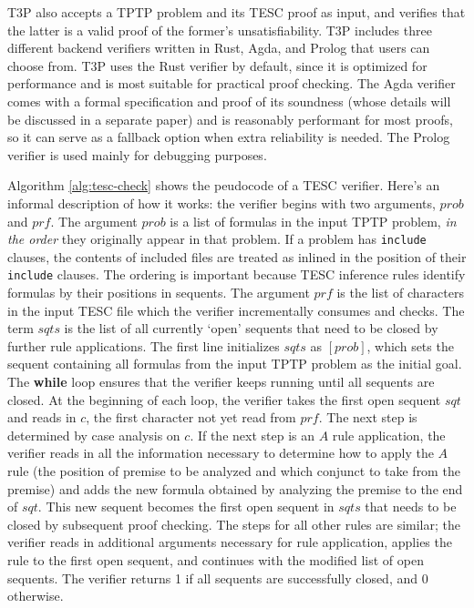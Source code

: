 \documentclass[12pt]{article}
\newcommand{\Prf}[0]{\mathit{prf}}
\newcommand{\Sqts}[0]{\mathit{sqts}}
\begin{document}
T3P also accepts a TPTP problem and its TESC proof as input, and verifies that the 
latter is a valid proof of the former's unsatisfiability. T3P includes three different
backend verifiers written in Rust, Agda, and Prolog that users can choose from.
T3P uses the Rust verifier by default, since it is optimized for performance and 
is most suitable for practical proof checking. The Agda verifier comes with a 
formal specification and proof of its soundness (whose details will be discussed in a 
separate paper) and is reasonably performant for most proofs, so it can serve as a 
fallback option when extra reliability is needed. The Prolog verifier is used mainly 
for debugging purposes.

Algorithm \ref{alg:tesc-check} shows the peudocode of a TESC verifier. 
Here's an informal description of how it works: the verifier begins 
with two arguments, $\mathit{prob}$ and $\mathit{prf}$. The argument $\mathit{prob}$ is a list 
of formulas in the input TPTP problem, \textit{in the order} they originally 
appear in that problem. If a problem has \texttt{include} clauses, the contents of included 
files are treated as inlined in the position of their \texttt{include} clauses. The ordering 
is important because TESC inference rules identify formulas by their positions in sequents.
The argument $\Prf$ is the list of characters in the input TESC file which the verifier
incrementally consumes and checks. The term $\Sqts$ is the list of all currently `open' sequents 
that need to be closed by further rule applications. The first line initializes $\Sqts$ 
as $[\mathit{prob}]$, which sets the sequent containing all formulas from the input TPTP problem 
as the initial goal. The \textbf{while} loop ensures that the verifier keeps running 
until all sequents are closed. At the beginning of each loop, the verifier takes the 
first open sequent $\mathit{sqt}$ and reads in $\mathit{c}$, the first character not 
yet read from $\mathit{prf}$. The next step is determined by case analysis on $\mathit{c}$.
If the next step is an $A$ rule application, the verifier reads in all the information
necessary to determine how to apply the $A$ rule (the position of premise to be analyzed
and which conjunct to take from the premise) and adds the new formula obtained by 
analyzing the premise to the end of $\mathit{sqt}$. This new sequent becomes the 
first open sequent in $\Sqts$ that needs to be closed by subsequent proof checking.
The steps for all other rules are similar; the verifier reads in additional arguments 
necessary for rule application, applies the rule to the first open sequent, and continues with 
the modified list of open sequents. The verifier returns 1 if all sequents are successfully
closed, and 0 otherwise.
\end{document}
